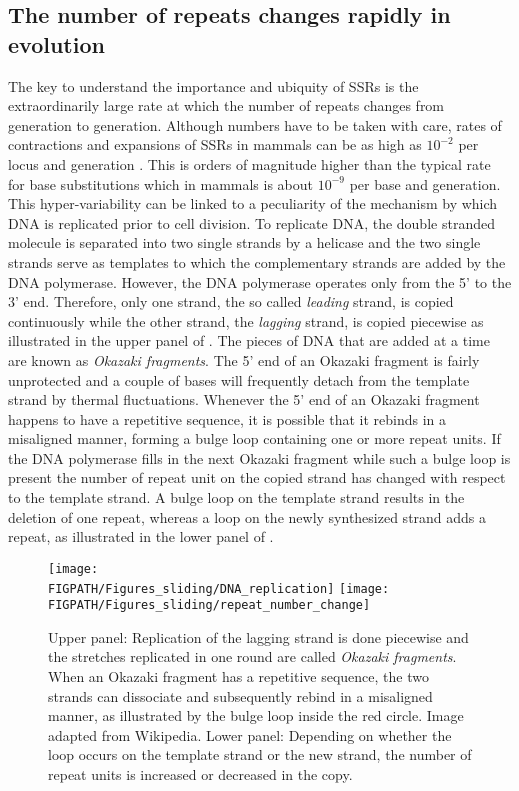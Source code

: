 \subsection{The number of repeats changes rapidly in evolution}
The key to understand the importance and ubiquity of SSRs
is the extraordinarily large rate at which the number of repeats changes from 
generation to generation. Although numbers have to be taken with care, rates
of contractions and expansions of SSRs in mammals can be as high as $10^{-2}$ per locus and
generation \cite{Dallas_MammGen_92}.
This is orders of magnitude higher than the typical rate for base substitutions which in mammals 
is about $10^{-9}$ per base and generation.	
This hyper-variability can be linked to a peculiarity of the mechanism by which DNA
is replicated prior to cell division. To replicate DNA, the double stranded molecule is
separated into two single strands by a helicase and the two single strands serve as
templates to which the complementary strands are added by the DNA polymerase. However,
the DNA polymerase operates only from the 5' to the 3' end. Therefore, only one strand,
the so called \emph{leading} strand, is copied continuously while the other strand, the \emph{lagging} strand, is
copied piecewise as illustrated in the upper panel of . 
The pieces of DNA that are added at a time
are known as \emph{Okazaki fragments}. The 5' end of an Okazaki fragment is fairly
unprotected and a couple of bases will frequently detach from the template strand by
thermal fluctuations. Whenever the 5' end of an Okazaki fragment happens to have a 
repetitive sequence, it is possible that it rebinds in a misaligned manner, forming a 
bulge loop containing one or more repeat units. 
%
If the DNA polymerase fills in the next Okazaki fragment while such a
bulge loop is present the number of repeat unit on the copied strand has changed with respect to the template strand. 
A bulge loop on the template strand  results in the deletion of one repeat, whereas a loop 
on the newly synthesized strand adds a repeat,
as illustrated in the lower panel of . 
\begin{figure}
\centering
\texttt{[image: \\FIGPATH/Figures\_sliding/DNA\_replication]}
\texttt{[image: \\FIGPATH/Figures\_sliding/repeat\_number\_change]}
\caption[Repeat number can increase or decrease during replication.]
{\label{fig:replication_slippage}
Upper panel: Replication of the lagging strand is done piecewise and the stretches replicated in one round
are called \emph{Okazaki fragments}. When an Okazaki fragment has a repetitive sequence,
the two strands can dissociate and subsequently rebind in a misaligned manner, as illustrated 
by the bulge loop inside the red circle. Image adapted from Wikipedia. Lower panel: Depending on whether the loop occurs on the template strand
or the new strand, the number of repeat units is increased or decreased in the copy.
}
\end{figure}

